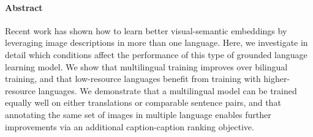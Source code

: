 


%

\paragraph{Abstract}

Recent work has shown how to learn better visual-semantic embeddings by leveraging image descriptions in more than one language. Here, we investigate in detail which conditions affect the performance of this type of grounded language learning model. We show that multilingual training improves over bilingual training, and that low-resource languages benefit from training with higher-resource languages. We demonstrate that a multilingual model can be trained equally well on either translations or comparable sentence pairs, and that annotating the same set of images in multiple language enables further improvements via an additional caption-caption ranking objective.



